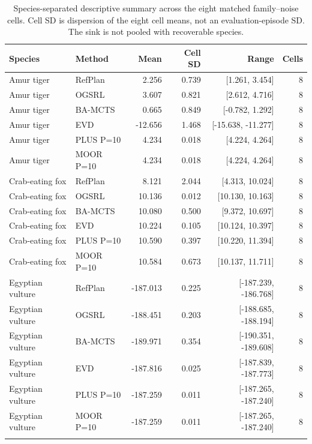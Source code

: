 \documentclass[10pt]{article}
\begin{document}
\begin{table}[p]
\centering\small
\begin{tabular}{@{}llrrrr@{}}
\toprule
Species & Method & Mean & Cell SD & Range & Cells \\
\midrule
Amur tiger & RefPlan & 2.256 & 0.739 & [1.261, 3.454] & 8 \\
Amur tiger & OGSRL & 3.607 & 0.821 & [2.612, 4.716] & 8 \\
Amur tiger & BA-MCTS & 0.665 & 0.849 & [-0.782, 1.292] & 8 \\
Amur tiger & EVD & -12.656 & 1.468 & [-15.638, -11.277] & 8 \\
Amur tiger & PLUS P=10 & 4.234 & 0.018 & [4.224, 4.264] & 8 \\
Amur tiger & MOOR P=10 & 4.234 & 0.018 & [4.224, 4.264] & 8 \\
\addlinespace[2pt]
Crab-eating fox & RefPlan & 8.121 & 2.044 & [4.313, 10.024] & 8 \\
Crab-eating fox & OGSRL & 10.136 & 0.012 & [10.130, 10.163] & 8 \\
Crab-eating fox & BA-MCTS & 10.080 & 0.500 & [9.372, 10.697] & 8 \\
Crab-eating fox & EVD & 10.224 & 0.105 & [10.124, 10.397] & 8 \\
Crab-eating fox & PLUS P=10 & 10.590 & 0.397 & [10.220, 11.394] & 8 \\
Crab-eating fox & MOOR P=10 & 10.584 & 0.673 & [10.137, 11.711] & 8 \\
\addlinespace[2pt]
Egyptian vulture & RefPlan & -187.013 & 0.225 & [-187.239, -186.768] & 8 \\
Egyptian vulture & OGSRL & -188.451 & 0.203 & [-188.685, -188.194] & 8 \\
Egyptian vulture & BA-MCTS & -189.971 & 0.354 & [-190.351, -189.608] & 8 \\
Egyptian vulture & EVD & -187.816 & 0.025 & [-187.839, -187.773] & 8 \\
Egyptian vulture & PLUS P=10 & -187.259 & 0.011 & [-187.265, -187.240] & 8 \\
Egyptian vulture & MOOR P=10 & -187.259 & 0.011 & [-187.265, -187.240] & 8 \\
\addlinespace[2pt]
\bottomrule
\end{tabular}
\caption{Species-separated descriptive summary across the eight matched family--noise cells. Cell SD is dispersion of the eight cell means, not an evaluation-episode SD. The sink is not pooled with recoverable species.}
\end{table}
\end{document}
